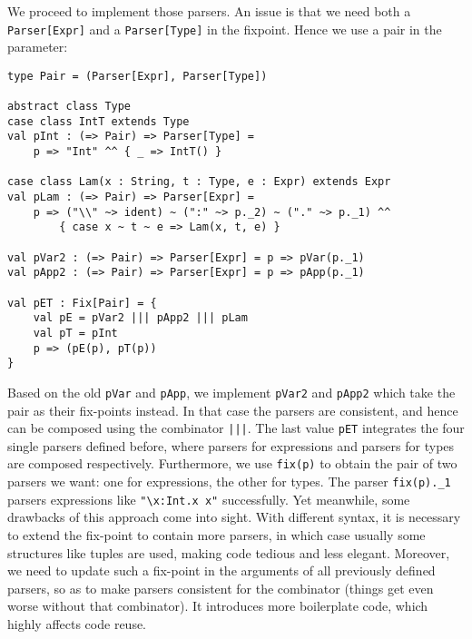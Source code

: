 We proceed to implement those parsers. An issue is that we need both a \lstinline{Parser[Expr]} and a \lstinline{Parser[Type]} in the fixpoint.
Hence we use a pair in the parameter:
\begin{lstlisting}
type Pair = (Parser[Expr], Parser[Type])

abstract class Type
case class IntT extends Type
val pInt : (=> Pair) => Parser[Type] =
    p => "Int" ^^ { _ => IntT() }

case class Lam(x : String, t : Type, e : Expr) extends Expr
val pLam : (=> Pair) => Parser[Expr] =
    p => ("\\" ~> ident) ~ (":" ~> p._2) ~ ("." ~> p._1) ^^
        { case x ~ t ~ e => Lam(x, t, e) }

val pVar2 : (=> Pair) => Parser[Expr] = p => pVar(p._1)
val pApp2 : (=> Pair) => Parser[Expr] = p => pApp(p._1)

val pET : Fix[Pair] = {
    val pE = pVar2 ||| pApp2 ||| pLam
    val pT = pInt
    p => (pE(p), pT(p))
}
\end{lstlisting}
Based on the old \lstinline{pVar} and \lstinline{pApp}, we implement \lstinline{pVar2} and \lstinline{pApp2} which take the pair as their fix-points instead.
In that case the parsers are consistent, and hence can be composed using the combinator \lstinline{|||}.
The last value \lstinline{pET} integrates the four single parsers defined before, where parsers for expressions and parsers for types are composed respectively. Furthermore, we use \lstinline{fix(p)} to obtain the pair of two parsers we want: one for expressions, the other for types. The parser \lstinline{fix(p)._1} parsers expressions like \lstinline{"\x:Int.x x"} successfully. Yet meanwhile, some drawbacks of this approach come into sight. With different syntax, it
is necessary to extend the fix-point to contain more parsers, in which case usually some structures like tuples are used,
making code tedious and less elegant. Moreover, we need to update such a fix-point in the arguments of all previously defined parsers, so as to make parsers consistent for the combinator (things get even worse without that combinator). It introduces more boilerplate code, which highly affects code reuse.

